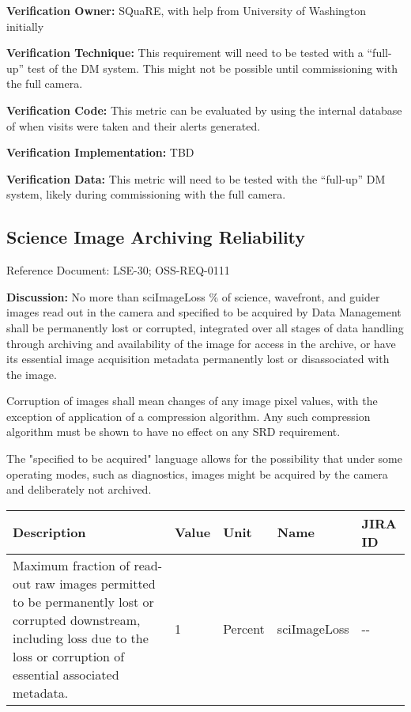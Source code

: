 \documentclass[DM,lsstdraft,toc]{lsstdoc}
\begin{document}
\textbf{Verification Owner:} SQuaRE, with help from University of
Washington initially

\textbf{Verification Technique:} This requirement will need to be tested
with a ``full-up'' test of the DM system. This might not be possible
until commissioning with the full camera.

\textbf{Verification Code:} This metric can be evaluated by using the
internal database of when visits were taken and their alerts generated.

\textbf{Verification Implementation:} TBD

\textbf{Verification Data:} This metric will need to be tested with the
``full-up'' DM system, likely during commissioning with the full camera.

\subsection{Science Image Archiving
Reliability}\label{science-image-archiving-reliability}

Reference Document: LSE-30; OSS-REQ-0111

\textbf{Discussion:} No more than sciImageLoss \% of science, wavefront,
and guider images read out in the camera and specified to be acquired by
Data Management shall be permanently lost or corrupted, integrated over
all stages of data handling through archiving and availability of the
image for access in the archive, or have its essential image acquisition
metadata permanently lost or disassociated with the image.

Corruption of images shall mean changes of any image pixel values, with
the exception of application of a compression algorithm. Any such
compression algorithm must be shown to have no effect on any SRD
requirement.

The "specified to be acquired" language allows for the possibility that
under some operating modes, such as diagnostics, images might be
acquired by the camera and deliberately not archived.

\begin{longtable}[]{@{}p{}llll@{}}
\toprule
Description & Value & Unit & Name & JIRA ID\tabularnewline
\midrule
\endhead
Maximum fraction of read-out raw images permitted to be permanently lost
or corrupted downstream, including loss due to the loss or corruption of
essential associated metadata. & 1 & Percent & sciImageLoss &
-\/-\tabularnewline
\bottomrule
\end{longtable}
\end{document}
